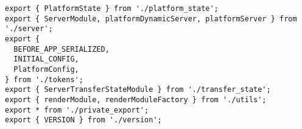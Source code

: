 \begin{verbatim}
export { PlatformState } from './platform_state';
export { ServerModule, platformDynamicServer, platformServer } from './server';
export {
  BEFORE_APP_SERIALIZED,
  INITIAL_CONFIG,
  PlatformConfig,
} from './tokens';
export { ServerTransferStateModule } from './transfer_state';
export { renderModule, renderModuleFactory } from './utils';
export * from './private_export';
export { VERSION } from './version';
\end{verbatim}
